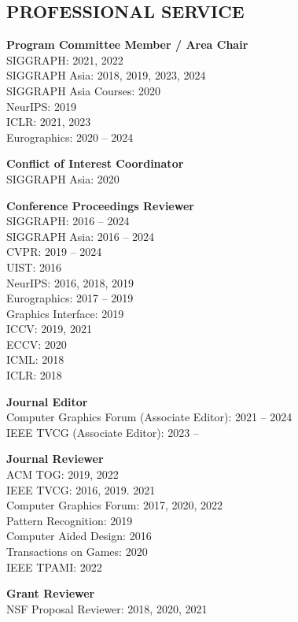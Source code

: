 \documentclass[line,margin]{res}
\begin{document}
\begin{resume}

\section{PROFESSIONAL SERVICE}

\textbf{Program Committee Member / Area Chair}\\
SIGGRAPH: 2021, 2022\\
SIGGRAPH Asia: 2018, 2019, 2023, 2024\\
SIGGRAPH Asia Courses: 2020\\
NeurIPS: 2019\\
ICLR: 2021, 2023\\
Eurographics: 2020 -- 2024

\textbf{Conflict of Interest Coordinator}\\
SIGGRAPH Asia: 2020

\textbf{Conference Proceedings Reviewer}\\
SIGGRAPH: 2016 -- 2024\\
SIGGRAPH Asia: 2016 -- 2024\\
CVPR: 2019 -- 2024\\
UIST: 2016\\
NeurIPS: 2016, 2018, 2019\\
Eurographics: 2017 --  2019\\
Graphics Interface: 2019\\
ICCV: 2019, 2021\\
ECCV: 2020\\
ICML: 2018\\
ICLR: 2018

\textbf{Journal Editor}\\
Computer Graphics Forum (Associate Editor): 2021 -- 2024\\
IEEE TVCG (Associate Editor): 2023 --

\textbf{Journal Reviewer}\\
ACM TOG: 2019, 2022\\
IEEE TVCG: 2016, 2019. 2021\\
Computer Graphics Forum: 2017, 2020, 2022\\
Pattern Recognition: 2019\\
Computer Aided Design: 2016\\
Transactions on Games: 2020\\
IEEE TPAMI: 2022

\textbf{Grant Reviewer}\\
NSF Proposal Reviewer: 2018, 2020, 2021


\end{resume}
\end{document}
